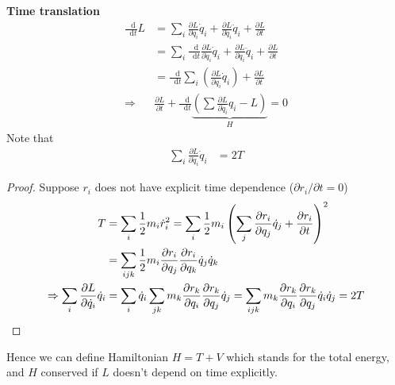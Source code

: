 \documentclass[twoside,9pt]{article}
\numberwithin{equation}{section} %
\renewcommand*\d{\mathop{}\!\mathrm{d}}
\theoremstyle{definition}
\theoremstyle{remark}
\begin{document}
\textbf{Time translation}
\begin{align}
    \frac{\d}{\d t}L &= 
    \sum_i\frac{\partial L}{\partial q_i}\dot{q}_i
    + \frac{\partial L}{\partial \dot{q}_i}\ddot{q}_i
    + \frac{\partial L}{\partial t}\\
    &= \sum_i\frac{\d}{\d t}\frac{\partial L}{\partial\dot{q}_i}\dot{q}_i
    + \frac{\partial L}{\partial \dot{q}_i}\ddot{q}_i
    + \frac{\partial L}{\partial t}\\
    &= \frac{\d}{\d t}\sum_i\left(\frac{\partial L}{\partial\dot{q}_i}\dot{q}_i\right)
    + \frac{\partial L}{\partial t}\\
    \Rightarrow &
    \frac{\partial L}{\partial t} + 
    \frac{\d}{\d t}\underbrace{\left(
    \sum\frac{\partial L}{\partial\dot{q}_i}q_i - L
    \right)}_{H}
    = 0
\end{align}
Note that
\begin{align}
    \sum_i\frac{\partial L}{\partial\dot{q}_i}\dot{q}_i &= 2T
\end{align}
\begin{proof}
Suppose $r_i$ does not have explicit time dependence ($\partial r_i/\partial t=0$)
\begin{align*}
    T &= \sum_i \frac{1}{2}m_i\dot{r}_i^2
    = \sum_i \frac{1}{2}m_i\left(
        \sum_j\frac{\partial r_i}{\partial q_j}\dot{q}_j
        + \frac{\partial r_i}{\partial t}
    \right)^2\\
    &= \sum_{ijk}
    \frac{1}{2}m_i\frac{\partial r_i}{\partial q_j}
    \frac{\partial r_i}{\partial q_k}\dot{q}_j\dot{q}_k\\
    \Rightarrow
    \sum_i\frac{\partial L}{\partial\dot{q}_i}\dot{q}_i
    &= 
    \sum_i \dot{q}_i \sum_{jk}
    m_k\frac{\partial r_k}{\partial q_i}\frac{\partial r_k}{\partial q_j}
    \dot{q}_j 
    = \sum_{ijk}
    m_k\frac{\partial r_k}{\partial q_i}\frac{\partial r_k}{\partial q_j}
    \dot q_i \dot{q}_j
    = 2T\qedhere
\end{align*}
\end{proof}
Hence we can define Hamiltonian $H = T+V$ which stands for the total energy,
and $H$ conserved if $L$ doesn't depend on time explicitly.
\end{document}
